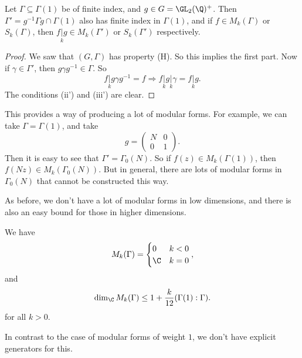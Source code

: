 \documentclass[a4paper]{article}
\begin{document}
\begin{prop}
  Let $\Gamma \subseteq \Gamma(1)$ be of finite index, and $g \in G = \GL_2(\Q)^+$. Then $\Gamma' = g^{-1} \Gamma g \cap \Gamma(1)$ also has finite index in $\Gamma(1)$, and if $f \in M_k(\Gamma)$ or $S_k(\Gamma)$, then $f\underset{k}{|} g \in M_k(\Gamma')$ or $S_k(\Gamma')$ respectively.
\end{prop}

\begin{proof}
  We saw that $(G, \Gamma)$ has property (H). So this implies the first part. Now if $\gamma \in \Gamma'$, then $g\gamma g^{-1} \in \Gamma$. So
  \[
    f \underset{k}{|}g \gamma g^{-1} = f \Rightarrow f\underset{k}{|} g \underset{k}{|}\gamma = f\underset{k}{|} g.
  \]
  The conditions (ii') and (iii') are clear.
\end{proof}
This provides a way of producing a lot of modular forms. For example, we can take $\Gamma = \Gamma(1)$, and take
\[
  g =
  \begin{pmatrix}
    N & 0\\
    0 & 1
  \end{pmatrix}.
\]
Then it is easy to see that $\Gamma' = \Gamma_0(N)$. So if $f(z) \in M_k(\Gamma(1))$, then $f(Nz) \in M_k(\Gamma_0(N))$. But in general, there are lots of modular forms in $\Gamma_0(N)$ that cannot be constructed this way.

As before, we don't have a lot of modular forms in low dimensions, and there is also an easy bound for those in higher dimensions.
\begin{thm}
  We have
  \[
    M_k(\Gamma) =
    \begin{cases}
      0 & k < 0\\
      \C & k = 0
    \end{cases},
  \]
  and
  \[
    \dim_\C M_k(\Gamma) \leq 1 + \frac{k}{12} (\Gamma(1): \Gamma).
  \]
  for all $k > 0$.
\end{thm}
In contrast to the case of modular forms of weight $1$, we don't have explicit generators for this.
\end{document}
